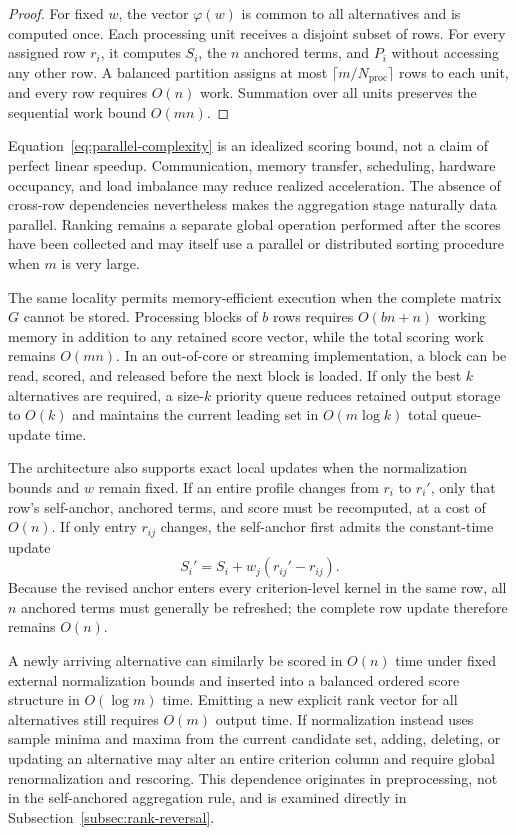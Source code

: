 \documentclass[reqno,11pt]{amsart}
\theoremstyle{definition}
\theoremstyle{plain}
\theoremstyle{remark}
\begin{document}
\begin{proof}
For fixed \(w\), the vector \(\varphi(w)\) is common to all alternatives and is
computed once. Each processing unit receives a disjoint subset of rows. For
every assigned row \(r_i\), it computes \(S_i\), the \(n\) anchored terms, and
\(P_i\) without accessing any other row. A balanced partition assigns at most
\(\lceil m/N_{\mathrm{proc}}\rceil\) rows to each unit, and every row requires
\(O(n)\) work. Summation over all units preserves the sequential work bound
\(O(mn)\).
\end{proof}

Equation~\eqref{eq:parallel-complexity} is an idealized scoring bound, not a
claim of perfect linear speedup. Communication, memory transfer, scheduling,
hardware occupancy, and load imbalance may reduce realized acceleration. The
absence of cross-row dependencies nevertheless makes the aggregation stage
naturally data parallel. Ranking remains a separate global operation performed
after the scores have been collected and may itself use a parallel or
distributed sorting procedure when \(m\) is very large.

The same locality permits memory-efficient execution when the complete matrix
\(G\) cannot be stored. Processing blocks of \(b\) rows requires
\(O(bn+n)\) working memory in addition to any retained score vector, while the
total scoring work remains \(O(mn)\). In an out-of-core or streaming
implementation, a block can be read, scored, and released before the next block
is loaded. If only the best \(k\) alternatives are required, a size-\(k\)
priority queue reduces retained output storage to \(O(k)\) and maintains the
current leading set in \(O(m\log k)\) total queue-update time.

The architecture also supports exact local updates when the normalization
bounds and \(w\) remain fixed. If an entire profile changes from \(r_i\) to
\(r_i'\), only that row's self-anchor, anchored terms, and score must be
recomputed, at a cost of \(O(n)\). If only entry \(r_{ij}\) changes, the
self-anchor first admits the constant-time update
\begin{equation*}
S_i'
=
S_i+w_j\left(r_{ij}'-r_{ij}\right).
\end{equation*}
Because the revised anchor enters every criterion-level kernel in the same row,
all \(n\) anchored terms must generally be refreshed; the complete row update
therefore remains \(O(n)\).

A newly arriving alternative can similarly be scored in \(O(n)\) time under
fixed external normalization bounds and inserted into a balanced ordered score
structure in \(O(\log m)\) time. Emitting a new explicit rank vector for all
alternatives still requires \(O(m)\) output time. If normalization instead uses
sample minima and maxima from the current candidate set, adding, deleting, or
updating an alternative may alter an entire criterion column and require global
renormalization and rescoring. This dependence originates in preprocessing,
not in the self-anchored aggregation rule, and is examined directly in
Subsection~\ref{subsec:rank-reversal}.
\end{document}
